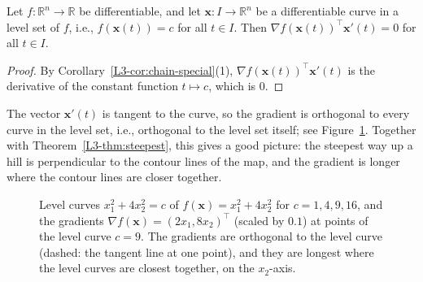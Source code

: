 \begin{corollary}\label{L3-cor:level-sets}
    Let $f: \mathbb{R}^n \to \mathbb{R}$ be differentiable, and let $\mathbf{x}: I \to \mathbb{R}^n$ be a differentiable curve in a level set of $f$, i.e., $f(\mathbf{x}(t)) = c$ for all $t \in I$. Then $\nabla f(\mathbf{x}(t))^\top \mathbf{x}'(t) = 0$ for all $t \in I$.
\end{corollary}

\begin{proof}
    By Corollary~\ref{L3-cor:chain-special}(1), $\nabla f(\mathbf{x}(t))^\top \mathbf{x}'(t)$ is the derivative of the constant function $t \mapsto c$, which is $0$.
\end{proof}

The vector $\mathbf{x}'(t)$ is tangent to the curve, so the gradient is orthogonal to every curve in the level set, i.e., orthogonal to the level set itself; see Figure~\ref{L3-fig:gradient-field}. Together with Theorem~\ref{L3-thm:steepest}, this gives a good picture: the steepest way up a hill is perpendicular to the contour lines of the map, and the gradient is longer where the contour lines are closer together.

\begin{figure}[ht]
    \centering
    \caption{Level curves $x_1^2 + 4x_2^2 = c$ of $f(\mathbf{x}) = x_1^2 + 4x_2^2$ for $c = 1, 4, 9, 16$, and the gradients $\nabla f(\mathbf{x}) = (2x_1, 8x_2)^\top$ (scaled by $0.1$) at points of the level curve $c = 9$. The gradients are orthogonal to the level curve (dashed: the tangent line at one point), and they are longest where the level curves are closest together, on the $x_2$-axis.}
    \label{L3-fig:gradient-field}
\end{figure}

